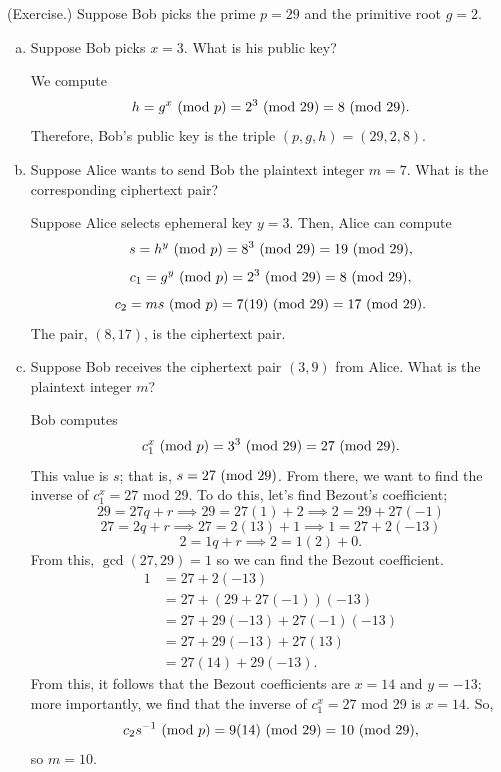 \documentclass[letterpaper]{article}
\begin{document}
\begin{mdframed}
    (Exercise.) Suppose Bob picks the prime $p = 29$ and the primitive root $g = 2$. 
    \begin{enumerate}[(a)]
        \item Suppose Bob picks $x = 3$. What is his public key? 
        \begin{mdframed}
            We compute \[h = g^x \ (\mathrm{mod}\ p) = 2^3 \ (\mathrm{mod}\ 29) = 8 \ (\mathrm{mod}\ 29).\] Therefore, Bob's public key is the triple $(p, g, h) = (29, 2, 8)$. 
        \end{mdframed}
        \item Suppose Alice wants to send Bob the plaintext integer $m = 7$. What is the corresponding ciphertext pair? 
        \begin{mdframed}
            Suppose Alice selects ephemeral key $y = 3$. Then, Alice can compute \[s = h^y \ (\mathrm{mod}\ p) = 8^3 \ (\mathrm{mod}\ 29) = 19 \ (\mathrm{mod}\ 29),\] \[c_1 = g^y \ (\mathrm{mod}\ p) = 2^{3} \ (\mathrm{mod}\ 29) = 8 \ (\mathrm{mod}\ 29),\] \[c_2 = ms \ (\mathrm{mod}\ p) = 7(19) \ (\mathrm{mod}\ 29) = 17 \ (\mathrm{mod}\ 29).\] The pair, $(8, 17)$, is the ciphertext pair. 
        \end{mdframed}
        \item Suppose Bob receives the ciphertext pair $(3, 9)$ from Alice. What is the plaintext integer $m$? 
        \begin{mdframed}
            Bob computes \[c_1^x \ (\mathrm{mod}\ p) = 3^3 \ (\mathrm{mod}\ 29) = 27 \ (\mathrm{mod}\ 29).\] This value is $s$; that is, $s = 27 \ (\mathrm{mod}\ 29)$. From there, we want to find the inverse of $c_1^x = 27$ mod 29. To do this, let's find Bezout's coefficient; 
            \[29 = 27q + r \implies 29 = 27(1) + 2 \implies 2 = 29 + 27(-1)\]
            \[27 = 2q + r \implies 27 = 2(13) + 1 \implies 1 = 27 + 2(-13)\]
            \[2 = 1q + r \implies 2 = 1(2) + 0.\]
            From this, $\gcd(27, 29) = 1$ so we can find the Bezout coefficient.
            \begin{equation*}
                \begin{aligned}
                    1 &= 27 + 2(-13) \\ 
                        &= 27 + (29 + 27(-1))(-13) \\
                        &= 27 + 29(-13) + 27(-1)(-13) \\ 
                        &= 27 + 29(-13) + 27(13) \\ 
                        &= 27(14) + 29(-13).
                \end{aligned}
            \end{equation*}
            From this, it follows that the Bezout coefficients are $x = 14$ and $y = -13$; more importantly, we find that the inverse of $c_1^x = 27$ mod 29 is $x = 14$. So, 
            \[c_2 s^{-1} \ (\mathrm{mod}\ p) = 9(14) \ (\mathrm{mod}\ 29) = 10 \ (\mathrm{mod}\ 29),\]
            so $m = 10$. 
        \end{mdframed}
    \end{enumerate}
\end{mdframed}
\end{document}
